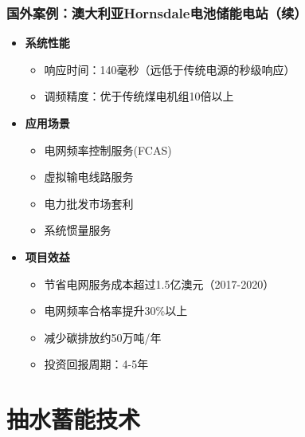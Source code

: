 \documentclass[aspectratio=169]{beamer}
\begin{document}
\begin{frame}
    \frametitle{国外案例：澳大利亚Hornsdale电池储能电站（续）}
    \begin{itemize}
        \item \textbf{系统性能}
        \begin{itemize}
            \item 响应时间：140毫秒（远低于传统电源的秒级响应）
            \item 调频精度：优于传统煤电机组10倍以上
        \end{itemize}
        
        \item \textbf{应用场景}
        \begin{itemize}
            \item 电网频率控制服务(FCAS)
            \item 虚拟输电线路服务
            \item 电力批发市场套利
            \item 系统惯量服务
        \end{itemize}
        
        \item \textbf{项目效益}
        \begin{itemize}
            \item 节省电网服务成本超过1.5亿澳元（2017-2020）
            \item 电网频率合格率提升30\%以上
            \item 减少碳排放约50万吨/年
            \item 投资回报周期：4-5年
        \end{itemize}
    \end{itemize}
\end{frame}

\section{抽水蓄能技术}
\end{document}
